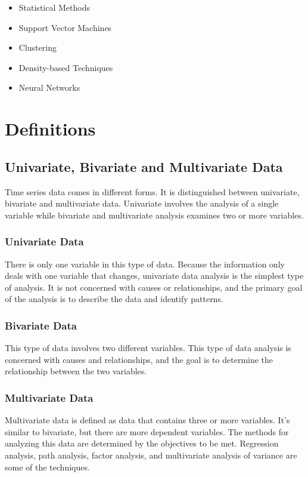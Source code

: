 \begin{itemize}
	\item Statistical Methods
	\item Support Vector Machines
	\item Clustering 
	\item Density-based Techniques
	\item Neural Networks 
\end{itemize}

\section{Definitions}

\subsection{Univariate, Bivariate and Multivariate Data}
Time series data comes in different forms. It is distinguished between univariate, bivariate and multivariate data. Univariate involves the analysis of a single variable while bivariate and multivariate analysis examines two or more variables.

\subsubsection{Univariate Data}
There is only one variable in this type of data. Because the information only deals with one variable that changes, univariate data analysis is the simplest type of analysis. It is not concerned with causes or relationships, and the primary goal of the analysis is to describe the data and identify patterns.

\subsubsection{Bivariate Data}
This type of data involves two different variables. This type of data analysis is concerned with causes and relationships, and the goal is to determine the relationship between the two variables.

\subsubsection{Multivariate Data}
Multivariate data is defined as data that contains three or more variables. It's similar to bivariate, but there are more dependent variables. The methods for analyzing this data are determined by the objectives to be met. Regression analysis, path analysis, factor analysis, and multivariate analysis of variance are some of the techniques.

